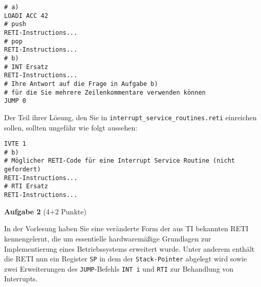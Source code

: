 \documentclass{article}
\newenvironment{adjustedminipage}[1]
  {\vspace{0.15cm}\begin{minipage}{#1}}
  {\end{minipage}}
\begin{document}
\begin{center}
	\begin{adjustedminipage}{0.9\textwidth}
		\begin{verbatim}
# a)
LOADI ACC 42
# push
RETI-Instructions...
# pop
RETI-Instructions...
# b)
# INT Ersatz
RETI-Instructions...
# Ihre Antwort auf die Frage in Aufgabe b)
# für die Sie mehrere Zeilenkommentare verwenden können
JUMP 0
    \end{verbatim}
	\end{adjustedminipage}
\end{center}

Der Teil ihrer Lösung, den Sie in \verb|interrupt_service_routines.reti| einreichen sollen, sollten ungefähr wie folgt aussehen:

\begin{center}
	\begin{adjustedminipage}{0.9\textwidth}
		\begin{verbatim}
IVTE 1
# b)
# Möglicher RETI-Code für eine Interrupt Service Routine (nicht gefordert)
RETI-Instructions...
# RTI Ersatz
RETI-Instructions...
    \end{verbatim}
	\end{adjustedminipage}
\end{center}

\vspace{0.5cm}
\textbf{Aufgabe 2} (4+2 Punkte)
\vspace{0.5cm}

In der Vorlesung haben Sie eine veränderte Form der aus TI bekannten RETI kennengelernt, die um essentielle hardwaremäßige Grundlagen zur Implementierung eines Betriebssystems erweitert wurde. Unter anderem enthält die RETI nun ein Register \verb|SP| in dem der \verb|Stack-Pointer| abgelegt wird sowie zwei Erweiterungen des \verb|JUMP|-Befehls \verb|INT i| und \verb|RTI| zur Behandlung von Interrupts.
\end{document}
